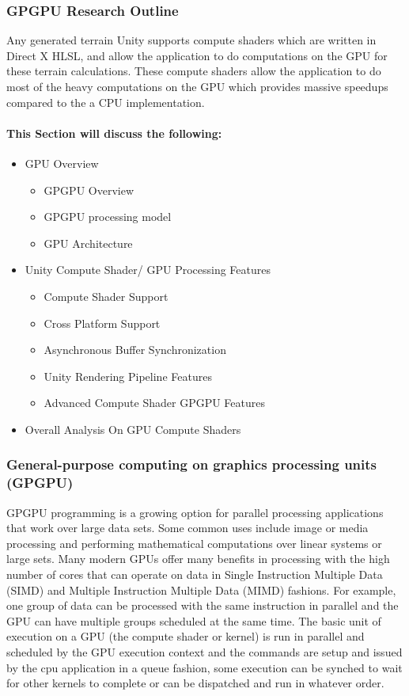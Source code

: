 \documentclass[a4paper,10pt,twoside]{article}
\begin{document}
\subsubsection{GPGPU Research Outline}
Any generated terrain Unity supports compute shaders which are written in Direct X HLSL, and allow the application to do computations on the GPU for
these terrain calculations. These compute shaders allow the application to do most of the heavy computations on the GPU which provides massive speedups compared to the a CPU implementation.
\paragraph{This Section will discuss the following:}
\begin{itemize}
	\item GPU Overview 
	\begin{itemize}
		\item GPGPU Overview
		\item GPGPU processing model
		\item GPU Architecture
	\end{itemize}
	\item Unity Compute Shader/ GPU Processing Features
	\begin{itemize}
		\item Compute Shader Support
		\item Cross Platform Support
		\item Asynchronous Buffer Synchronization
		\item Unity Rendering Pipeline Features
		\item Advanced Compute Shader GPGPU Features
	\end{itemize}
	\item Overall Analysis On GPU Compute Shaders
\end{itemize}
\pagebreak
\subsubsection{General-purpose computing on graphics processing units (GPGPU)}
GPGPU programming is a growing option for parallel processing applications that work over large data sets. Some common uses include image or media processing and 
performing mathematical computations over linear systems or large sets. Many modern GPUs offer many benefits in processing with the high number of cores that can operate on data 
in Single Instruction Multiple Data (SIMD) and Multiple Instruction Multiple Data (MIMD) fashions. For example, one group of data can be processed with the same instruction in parallel 
and the GPU can have multiple groups scheduled at the same time. The basic unit of execution on a GPU (the compute shader or kernel) is run in parallel and scheduled by the GPU execution context
and the commands are setup and issued by the cpu application in a queue fashion, some execution can be synched to wait for other kernels to complete or can be dispatched and run in whatever order.
\end{document}
